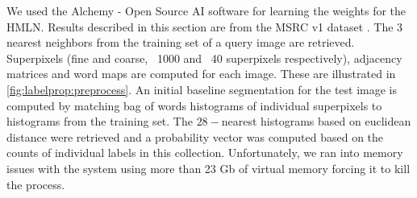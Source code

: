 \documentclass{article} %
\begin{document}
We used the Alchemy - Open Source AI software \cite{alchemy} for learning the weights for the HMLN. Results described in this section are from the MSRC v1 dataset \cite{DBLP:conf/iccv/WinnCM05}. The 3 nearest neighbors from the training set of a query image are retrieved. Superpixels (fine and coarse, ~1000 and ~40 superpixels respectively), adjacency matrices and word maps are computed for each image. These are illustrated in \ref{fig:labelprop:preprocess}. An initial baseline segmentation for the test image is computed by matching bag of words histograms of individual superpixels to histograms from the training set. The $28-$nearest histograms based on euclidean distance were retrieved and a probability vector was computed based on the counts of individual labels in this collection.
Unfortunately, we ran into memory issues with the system using more than 23 Gb of virtual memory forcing it to kill the process. 
\end{document}
